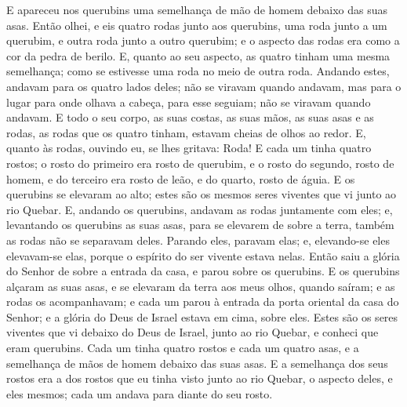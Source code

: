 E apareceu nos querubins uma semelhança de mão de homem debaixo
das suas asas. Então olhei, e eis quatro rodas junto aos
querubins, uma roda junto a um querubim, e outra roda junto a outro
querubim; e o aspecto das rodas era como a cor da pedra de berilo.
E, quanto ao seu aspecto, as quatro tinham uma mesma
semelhança; como se estivesse uma roda no meio de outra roda.
Andando estes, andavam para os quatro lados deles; não se
viravam quando andavam, mas para o lugar para onde olhava a cabeça,
para esse seguiam; não se viravam quando andavam. E todo o
seu corpo, as suas costas, as suas mãos, as suas asas e as rodas, as
rodas que os quatro tinham, estavam cheias de olhos ao redor.
E, quanto às rodas, ouvindo eu, se lhes gritava: Roda!
E cada um tinha quatro rostos; o rosto do primeiro era rosto
de querubim, e o rosto do segundo, rosto de homem, e do terceiro era
rosto de leão, e do quarto, rosto de águia. E os querubins se
elevaram ao alto; estes são os mesmos seres viventes que vi junto ao
rio Quebar. E, andando os querubins, andavam as rodas
juntamente com eles; e, levantando os querubins as suas asas, para
se elevarem de sobre a terra, também as rodas não se separavam
deles. Parando eles, paravam elas; e, elevando-se eles
elevavam-se elas, porque o espírito do ser vivente estava nelas.
Então saiu a glória do Senhor de sobre a entrada da casa, e
parou sobre os querubins. E os querubins alçaram as suas
asas, e se elevaram da terra aos meus olhos, quando saíram; e as
rodas os acompanhavam; e cada um parou à entrada da porta oriental
da casa do Senhor; e a glória do Deus de Israel estava em cima,
sobre eles. Estes são os seres viventes que vi debaixo do
Deus de Israel, junto ao rio Quebar, e conheci que eram querubins.
Cada um tinha quatro rostos e cada um quatro asas, e a
semelhança de mãos de homem debaixo das suas asas. E a
semelhança dos seus rostos era a dos rostos que eu tinha visto junto
ao rio Quebar, o aspecto deles, e eles mesmos; cada um andava para
diante do seu rosto.

\medskip

